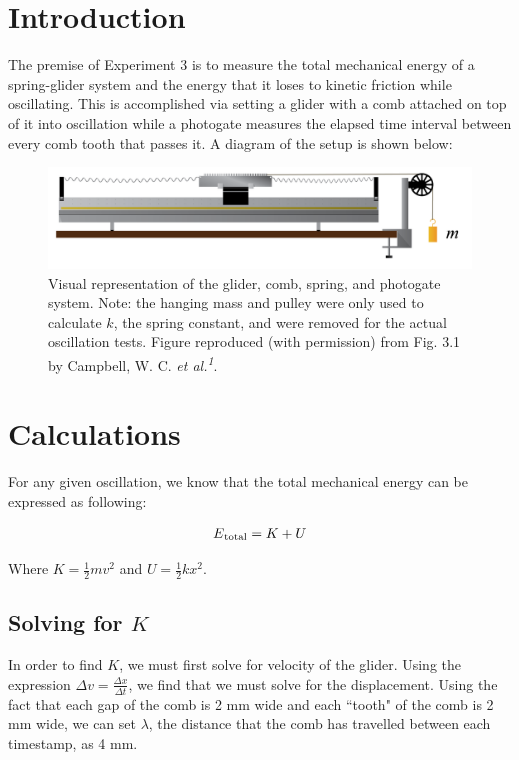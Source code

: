 \documentclass[titlepage]{article}
\begin{document}
\pagebreak

\section{Introduction}
The premise of Experiment 3 is to measure the total mechanical energy of a spring-glider system and the energy that it loses to kinetic friction while oscillating. This is accomplished via setting a glider with a comb attached on top of it into oscillation while a photogate measures the elapsed time interval between every comb tooth that passes it. A diagram of the setup is shown below:

\begin{figure}[!htbp]
    \centering
    \includegraphics[width=5.0in]{Setup.png}
    \caption{Visual representation of the glider, comb, spring, and photogate system. Note: the hanging mass and pulley were only used to calculate $k$, the spring constant, and were removed for the actual oscillation tests. Figure reproduced (with permission) from Fig. 3.1 by Campbell, W. C. \textit{et al.\textsuperscript{1}}.}
\end{figure}

\section{Calculations}
For any given oscillation, we know that the total mechanical energy can be expressed as following:

\begin{align}
E\textsubscript{total} = K + U
\end{align}

\begin{center}
Where $K = \frac{1}{2}mv^2$ and $U = \frac{1}{2}kx^2$.
\end{center}

\subsection{Solving for $K$}
In order to find $K$, we must first solve for velocity of the glider. Using the expression $\Delta v = \frac{\Delta x}{\Delta t}$, we find that we must solve for the displacement. Using the fact that each gap of the comb is 2 mm wide and each ``tooth" of the comb is 2 mm wide, we can set $\lambda$, the distance that the comb has travelled between each timestamp, as 4 mm.
\end{document}
